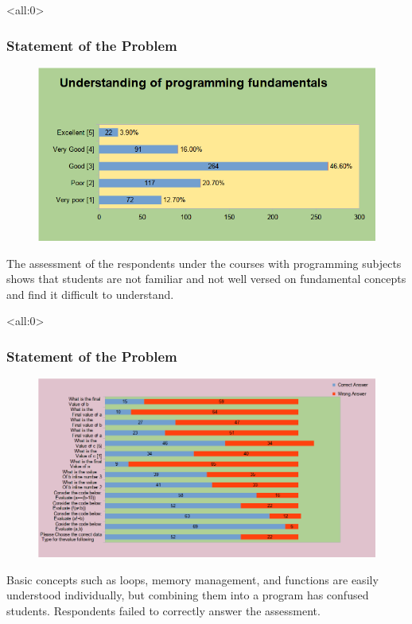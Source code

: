 \documentclass{beamer}
\newcommand{\parx}{
	\setlength{\parindent}{4em}
	\par}
\begin{document}
\begin{frame}<all:0>
	\frametitle{Statement of the Problem}
	\begin{figure}
		\includegraphics[scale=0.25]{results/12.png}
	\end{figure}

	\justifying
	\parx
	The assessment of the respondents under the courses with programming subjects
	shows that students are not familiar and not well versed on fundamental
	concepts and find it difficult to understand.
\end{frame}

\begin{frame}<all:0>
	\frametitle{Statement of the Problem}
	\begin{figure}
		\includegraphics[scale=0.25]{results/13.png}
	\end{figure}

	\justifying
	\parx
	Basic concepts such as loops, memory management, and functions are easily
	understood individually, but combining them into a program has confused
	students. Respondents failed to correctly answer the assessment.
\end{frame}
\end{document}
